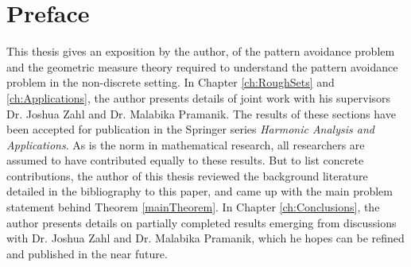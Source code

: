 
\chapter{Preface}

This thesis gives an exposition by the author, of the pattern avoidance problem and the geometric measure theory required to understand the pattern avoidance problem in the non-discrete setting. In Chapter \ref{ch:RoughSets} and \ref{ch:Applications}, the author presents details of joint work with his supervisors Dr. Joshua Zahl and Dr. Malabika Pramanik. The results of these sections have been accepted for publication in the Springer series \emph{Harmonic Analysis and Applications}. As is the norm in mathematical research, all researchers are assumed to have contributed equally to these results. But to list concrete contributions, the author of this thesis reviewed the background literature detailed in the bibliography to this paper, and came up with the main problem statement behind Theorem \ref{mainTheorem}. In Chapter \ref{ch:Conclusions}, the author presents details on partially completed results emerging from discussions with Dr. Joshua Zahl and Dr. Malabika Pramanik, which he hopes can be refined and published in the near future.